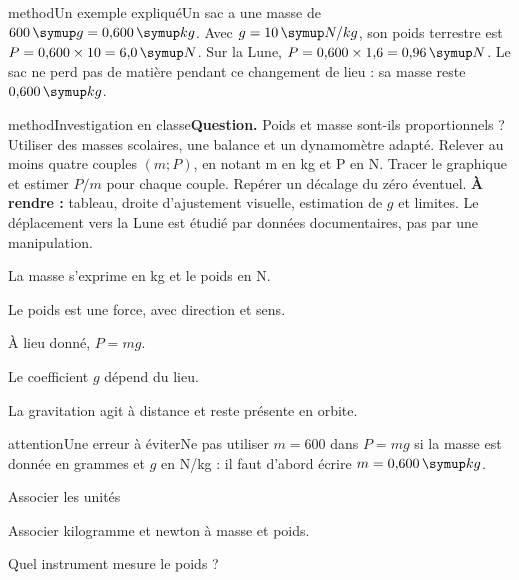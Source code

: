 \begin{pcEncadre}{method}{Un exemple expliqué}Un sac a une masse de $600\unite g=0{,}600\unite{kg}$. Avec $g=10\unite{N/kg}$, son poids terrestre est $P=0{,}600\times10=6{,}0\unite N$. Sur la Lune, $P=0{,}600\times1{,}6=0{,}96\unite N$. Le sac ne perd pas de matière pendant ce changement de lieu : sa masse reste $0{,}600\unite{kg}$.\end{pcEncadre}
\label{activite-11}
\begin{pcEncadre}{method}{Investigation en classe}\textbf{Question.} Poids et masse sont-ils proportionnels ? Utiliser des masses scolaires, une balance et un dynamomètre adapté. Relever au moins quatre couples $(m;P)$, en notant m en kg et P en N. Tracer le graphique et estimer $P/m$ pour chaque couple. Repérer un décalage du zéro éventuel. \textbf{À rendre :} tableau, droite d’ajustement visuelle, estimation de $g$ et limites. Le déplacement vers la Lune est étudié par données documentaires, pas par une manipulation.\end{pcEncadre}
\begin{questions}
\item La masse s’exprime en kg et le poids en N.
\item Le poids est une force, avec direction et sens.
\item À lieu donné, $P=mg$.
\item Le coefficient $g$ dépend du lieu.
\item La gravitation agit à distance et reste présente en orbite.
\end{questions}
\begin{pcEncadre}{attention}{Une erreur à éviter}Ne pas utiliser $m=600$ dans $P=mg$ si la masse est donnée en grammes et $g$ en N/kg : il faut d’abord écrire $m=0{,}600\unite{kg}$.\end{pcEncadre}
\pcGrille
\clearpage{}
\par\noindent\begin{minipage}{\linewidth}
\begin{exercice}[1]{Associer les unités}
\begin{questions}
\item Associer kilogramme et newton à masse et poids.
\item Quel instrument mesure le poids ?
\end{questions}
\end{exercice}
\end{minipage}
